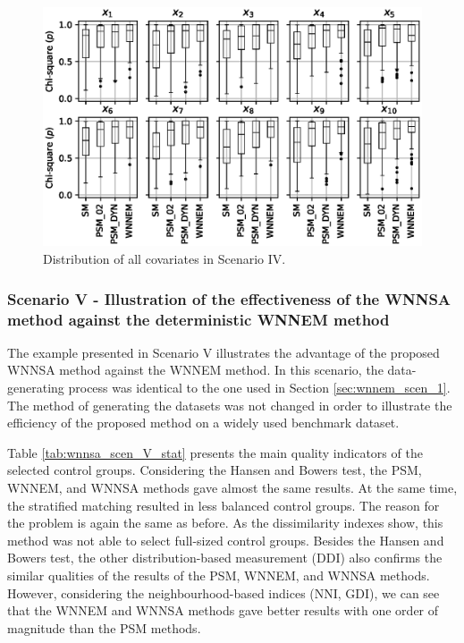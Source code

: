 		\begin{figure}[h!]
			\centering
			\captionsetup{justification=centering}
			\includegraphics[width=\textwidth]{assets/figures/control_group_selection/wnnsa/scenIV/distribution.eps}
			\caption{Distribution of all covariates in Scenario IV. %
			}
			\label{fig:wnnsa_scen_IV_distribution}    
		\end{figure}
										
										
		\subsubsection{Scenario V - Illustration of the effectiveness of the WNNSA method against the deterministic WNNEM method}
		\label{sec:wnnsa_scen_V}
										
		The example presented in Scenario V illustrates the advantage of the proposed WNNSA method against the WNNEM method. In this scenario, the data-generating process was identical to the one used in Section \ref{sec:wnnem_scen_1}. The method of generating the datasets was not changed in order to illustrate the efficiency of the proposed method on a widely used benchmark dataset.
										
		Table \ref{tab:wnnsa_scen_V_stat} presents the main quality indicators of the selected control groups. Considering the Hansen and Bowers test, the PSM, WNNEM, and WNNSA methods gave almost the same results. At the same time, the stratified matching resulted in less balanced control groups. The reason for the problem is again the same as before. As the dissimilarity indexes show, this method was not able to select full-sized control groups. Besides the Hansen and Bowers test, the other distribution-based measurement (DDI) also confirms the similar qualities of the results of the PSM, WNNEM, and WNNSA methods. However, considering the neighbourhood-based indices (NNI, GDI), we can see that the WNNEM and WNNSA methods gave better results with one order of magnitude than the PSM methods.
										
